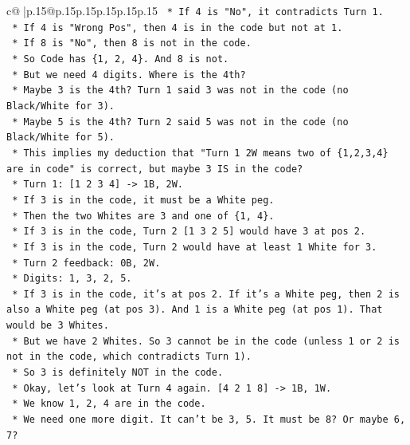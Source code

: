 \documentclass{article}
\begin{document}
{\begin{supertabular}{c@{$\;$}|p{.15\linewidth}@{}p{.15\linewidth}p{.15\linewidth}p{.15\linewidth}p{.15\linewidth}p{.15\linewidth}}
{{{\texttt{        *   If 4 is "No", it contradicts Turn 1.} \\
\texttt{        *   If 4 is "Wrong Pos", then 4 is in the code but not at 1.} \\
\texttt{        *   If 8 is "No", then 8 is not in the code.} \\
\texttt{        *   So Code has \{1, 2, 4\}. And 8 is not.} \\
\texttt{        *   But we need 4 digits. Where is the 4th?} \\
\texttt{        *   Maybe 3 is the 4th? Turn 1 said 3 was not in the code (no Black/White for 3).} \\
\texttt{        *   Maybe 5 is the 4th? Turn 2 said 5 was not in the code (no Black/White for 5).} \\
\texttt{        *   This implies my deduction that "Turn 1 2W means two of \{1,2,3,4\} are in code" is correct, but maybe 3 IS in the code?} \\
\texttt{        *   Turn 1: {[}1 2 3 4{]} {-}> 1B, 2W.} \\
\texttt{            *   If 3 is in the code, it must be a White peg.} \\
\texttt{            *   Then the two Whites are 3 and one of \{1, 4\}.} \\
\texttt{            *   If 3 is in the code, Turn 2 {[}1 3 2 5{]} would have 3 at pos 2.} \\
\texttt{            *   If 3 is in the code, Turn 2 would have at least 1 White for 3.} \\
\texttt{            *   Turn 2 feedback: 0B, 2W.} \\
\texttt{            *   Digits: 1, 3, 2, 5.} \\
\texttt{            *   If 3 is in the code, it's at pos 2. If it's a White peg, then 2 is also a White peg (at pos 3). And 1 is a White peg (at pos 1). That would be 3 Whites.} \\
\texttt{            *   But we have 2 Whites. So 3 cannot be in the code (unless 1 or 2 is not in the code, which contradicts Turn 1).} \\
\texttt{            *   So 3 is definitely NOT in the code.} \\
\texttt{    *   Okay, let's look at Turn 4 again. {[}4 2 1 8{]} {-}> 1B, 1W.} \\
\texttt{        *   We know 1, 2, 4 are in the code.} \\
\texttt{        *   We need one more digit. It can't be 3, 5. It must be 8? Or maybe 6, 7?} \\
}}}
\end{supertabular}}
\end{document}
